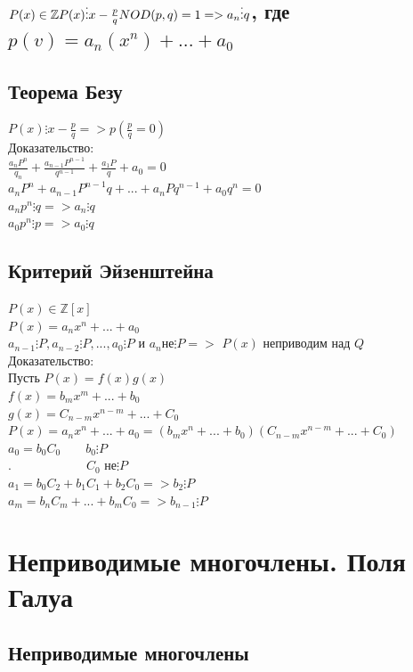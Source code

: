 \documentclass[12pt]{article}
\begin{document}
    \subsection{$P(x) \in\mathbb{Z} P(x)\vdots x - \frac{p}{q}\\NOD(p,q)=1 => a_n \vdots q $, где $p(v)=a_n(x^n)+...+a_0$}
    \subsection{Теорема Безу}
    \noindent $P(x) \vdots x - \frac{p}{q} => p(\frac{p}{q} = 0)$
    \\Доказательство:
    \\$\frac{a_nP^n}{q_n}+\frac{a_{n-1}P^{n-1}}{q^{n-1}}+\frac{a_1P}{q}+a_0=0$
        \\$a_nP^n+a_{n-1}P^{n-1}q+...+a_nPq^{n-1}+a_0q^n=0$
    \\$a_np^n \vdots q => a_n \vdots q$
        \\$a_0p^n \vdots p => a_0 \vdots q$
    \subsection{Критерий Эйзенштейна}
    \noindent $P(x) \in \mathbb{Z}[x]$
    \\$P(x) = a_nx^n+...+a_0$
        \\$a_{n-1}\vdots P, a_{n-2} \vdots P,...,a_0\vdots P$ и $a_n$не$\vdots P=>$ $P(x)$ неприводим над $Q$
    \\Доказательство:
    \\Пусть $P(x) = f(x)g(x)$
    \\$f(x) = b_mx^m+...+b_0$
        \\$g(x) = C_{n-m}x^{n-m}+...+C_0$
    \\$P(x) = a_nx^n+...+a_0=(b_mx^n+...+b_0)(C_{n-m}x^{n-m}+...+C_0)$
        \\$a_0=b_0C_0 \qquad b_0 \vdots P$
    \\$. \hspace{6em}C_0$ не$ \vdots P$
        \\$a_1=b_0C_2+b_1C_1+b_2C_0 => b_2\vdots P $
    \\$a_m=b_nC_m+...+b_mC_0 => b_{n-1}\vdots P $

        \setcounter{section}{12}
        \section{Неприводимые многочлены. Поля Галуа}
        \subsection{Неприводимые многочлены}
\end{document}
